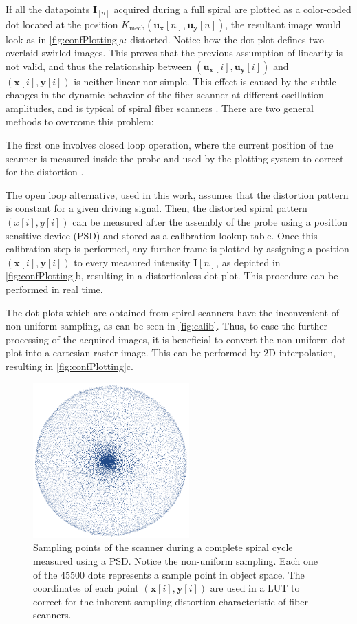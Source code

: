 If all the datapoints $\mathbf{I}_{[n]}$ acquired during a full spiral are plotted as a color-coded dot located at the position $K_\mathrm{mech}(\mathbf{u_x}[n], \mathbf{u_y}[n])$, the resultant image would look as in \autoref{fig:confPlotting}a: distorted. Notice how the dot plot defines two overlaid swirled images. This proves that the previous assumption of linearity is not valid, and thus the relationship between $(\mathbf{u_x}[i], \mathbf{u_y}[i])$ and $(\mathbf{x}[i], \mathbf{y}[i])$ is neither linear nor simple. This effect is caused by the subtle changes in the dynamic behavior of the fiber scanner at different oscillation amplitudes, and is typical of spiral fiber scanners \cite{Seibel2006}. There are two general methods to overcome this problem:

The first one involves closed loop operation, where the current position of the scanner is measured inside the probe and used by the plotting system to correct for the distortion \cite{Yeoh2014}. 

The open loop alternative, used in this work, assumes that the distortion pattern is constant for a given driving signal. Then, the distorted spiral pattern $(x[i], y[i])$ can be measured after the assembly of the probe using a position sensitive device (PSD) and stored as a calibration lookup table.
Once this calibration step is performed, any further frame is plotted by assigning a position $(\mathbf{x}[i], \mathbf{y}[i])$ to every measured intensity $\mathbf{I}[n]$, as depicted in \autoref{fig:confPlotting}b, resulting in a distortionless dot plot. This procedure can be performed in real time.

The dot plots which are obtained from spiral scanners have the inconvenient of non-uniform sampling, as can be seen in \autoref{fig:calib}. Thus, to ease the further processing of the acquired images, it is beneficial to convert the non-uniform dot plot into a cartesian raster image. This can be performed by 2D interpolation, resulting in \autoref{fig:confPlotting}c.


\begin{figure}[h!]\centering \includegraphics[width=6cm]{figures/50_Measurements/conf/proc/samplingDensity.png}
      \caption{Sampling points of the scanner during a complete spiral cycle measured using a PSD. Notice the non-uniform sampling. Each one of the 45500 dots represents a sample point in object space. The coordinates of each point $(\mathbf{x}[i], \mathbf{y}[i])$ are used in a LUT to correct for the inherent sampling distortion characteristic of fiber scanners.}
      \label{fig:calib}
\end{figure}


